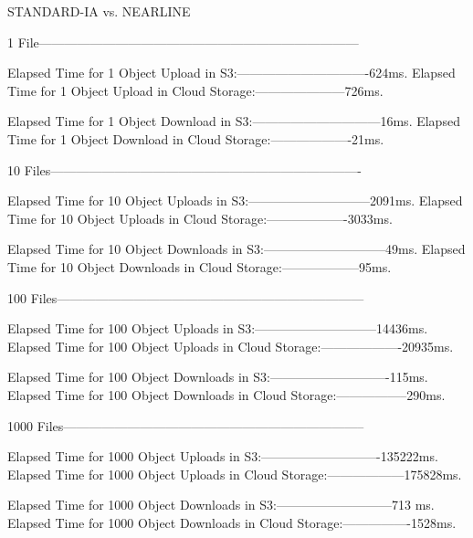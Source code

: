 \begin{code}
STANDARD-IA vs. NEARLINE

1 File---------------------------------------------------------------------------

Elapsed Time for 1  Object Upload in S3:-------------------------------624ms.
Elapsed Time for 1 Object Upload in Cloud Storage:---------------------726ms.

Elapsed Time for 1 Object Download in S3:------------------------------16ms.
Elapsed Time for 1 Object Download in Cloud Storage:-------------------21ms.

10 Files-------------------------------------------------------------------------

Elapsed Time for 10  Object Uploads in S3:-----------------------------2091ms.
Elapsed Time for 10 Object Uploads in Cloud Storage:-------------------3033ms.

Elapsed Time for 10 Object Downloads in S3:-----------------------------49ms.
Elapsed Time for 10 Object Downloads in Cloud Storage:------------------95ms.

100 Files------------------------------------------------------------------------

Elapsed Time for 100  Object Uploads in S3:-----------------------------14436ms.
Elapsed Time for 100 Object Uploads in Cloud Storage:-------------------20935ms.

Elapsed Time for 100 Object Downloads in S3:----------------------------115ms.
Elapsed Time for 100 Object Downloads in Cloud Storage:-----------------290ms.

1000 Files-----------------------------------------------------------------------

Elapsed Time for 1000  Object Uploads in S3:----------------------------135222ms.
Elapsed Time for 1000 Object Uploads in Cloud Storage:------------------175828ms.

Elapsed Time for 1000 Object Downloads in S3:---------------------------713 ms.
Elapsed Time for 1000 Object Downloads in Cloud Storage:----------------1528ms.
\end{code}

\newpage

